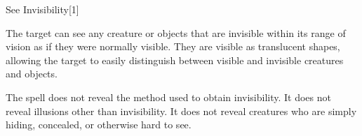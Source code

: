 \begin{spellsection}{See Invisibility}[1]
    \begin{spellheader}
    \end{spellheader}
    \begin{spellcontent}
        \begin{spelltargetinginfo}
        \end{spelltargetinginfo}
        \begin{spelleffects}
            \spelleffect The target can see any creature or objects that are invisible within its range of vision as if they were normally visible. They are visible as translucent shapes, allowing the target to easily distinguish between visible and invisible creatures and objects.
            \spelldur \durpersonallong
        \end{spelleffects}
    \end{spellcontent}
    \begin{spellfooter}
        \spellnotes The spell does not reveal the method used to obtain invisibility. It does not reveal illusions other than invisibility. It does not reveal creatures who are simply hiding, concealed, or otherwise hard to see.
        \miscastexplode
    \end{spellfooter}
    \begin{spellaugments}
    \end{spellaugments}
\end{spellsection}


